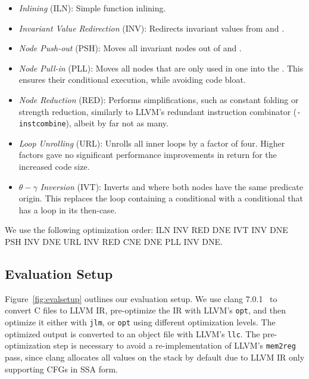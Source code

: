 \begin{itemize}
	\item \textit{Inlining} (ILN): Simple function inlining.

	\item \textit{Invariant Value Redirection} (INV): Redirects invariant values from \thetam and
		\gammanodes.

	\item \textit{Node Push-out} (PSH): Moves all invariant nodes out of \gammam and \thetaregions.

	\item \textit{Node Pull-in} (PLL): Moves all nodes that are only used in one \gammaregion into
		the \gammanode. This ensures their conditional execution, while avoiding code bloat.

	\item \textit{Node Reduction} (RED): Performs simplifications, such as constant folding or
		strength reduction, similarly to LLVM's redundant instruction combinator
		(\texttt{-instcombine}), albeit by far not as many.

	\item \textit{Loop Unrolling} (URL): Unrolls all inner loops by a factor of four. Higher factors
		gave no significant performance improvements in return for the increased code size.

	\item \textit{$\theta-\gamma$ Inversion} (IVT): Inverts \gammam and \thetanodes where both nodes
		have the same predicate origin. This replaces the loop containing a conditional with a
		conditional that has a loop in its then-case.
\end{itemize}

We use the following optimization order: ILN INV RED DNE IVT INV DNE PSH INV DNE URL INV RED CNE
DNE PLL INV DNE.

\subsection{Evaluation Setup}

Figure~\ref{fig:evalsetup} outlines our evaluation setup. We use clang 7.0.1~\cite{clang} to
convert C files to LLVM IR, pre-optimize the IR with LLVM's \texttt{opt}, and then optimize
it either with \texttt{jlm}, or \texttt{opt} using different optimization levels. The optimized
output is converted to an object file with LLVM's \texttt{llc}. The pre-optimization step is
necessary to avoid a re-implementation of LLVM's \texttt{mem2reg} pass, since clang allocates all
values on the stack by default due to LLVM IR only supporting CFGs in SSA form.

